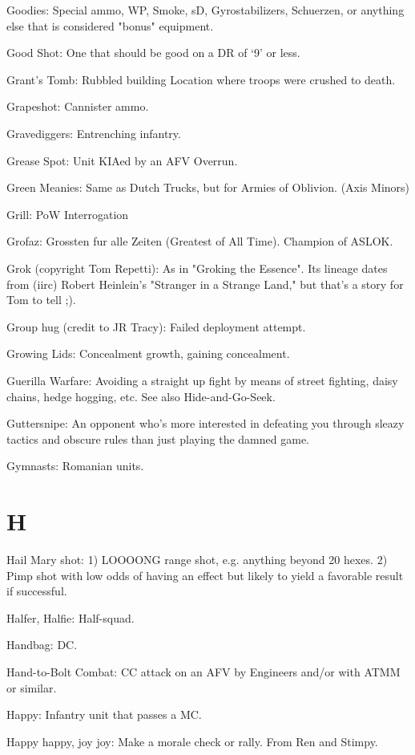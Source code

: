 \documentclass[letterpaper]{article}
\begin{document}
Goodies: Special ammo, WP, Smoke, sD, Gyrostabilizers, Schuerzen, or anything else that is considered "bonus" equipment.

Good Shot: One that should be good on a DR of `9' or less.

Grant's Tomb: Rubbled building Location where troops were crushed to death.

Grapeshot: Cannister ammo.

Gravediggers: Entrenching infantry.

Grease Spot:  Unit KIAed by an AFV Overrun.

Green Meanies: Same as Dutch Trucks, but for Armies of Oblivion. (Axis Minors)

Grill: PoW Interrogation

Grofaz: Grossten fur alle Zeiten (Greatest of All Time). Champion of ASLOK.

Grok (copyright Tom Repetti): As in "Groking the Essence". Its lineage dates from (iirc) Robert Heinlein's "Stranger in a Strange Land," but that's a story for Tom to tell ;).

Group hug (credit to JR Tracy): Failed deployment attempt.

Growing Lids: Concealment growth, gaining concealment.

Guerilla Warfare: Avoiding a straight up fight by means of street fighting, daisy chains, hedge hogging, etc. See also Hide-and-Go-Seek.

Guttersnipe: An opponent who's more interested in defeating you through sleazy tactics and obscure rules than just playing the damned game.

Gymnasts:  Romanian units.

\section{H}

Hail Mary shot: 1) LOOOONG range shot, e.g. anything beyond 20 hexes. 2) Pimp shot with low odds of having an effect but likely to yield a favorable result if successful.

Halfer, Halfie: Half-squad.

Handbag: DC.

Hand-to-Bolt Combat: CC attack on an AFV by Engineers and/or with ATMM or similar.

Happy: Infantry unit that passes a MC.

Happy happy, joy joy: Make a morale check or rally. From Ren and Stimpy.
\end{document}
